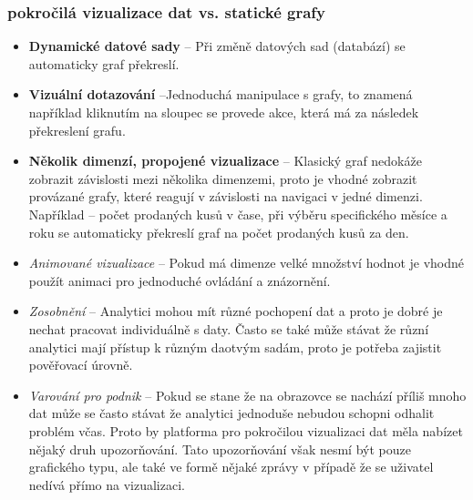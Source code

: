 \subsubsection{pokročilá vizualizace dat vs. statické grafy}
\begin{itemize}
  \item \textbf{Dynamické datové sady} -- Při změně datových sad (databází) se automaticky graf překreslí.
  \item \textbf{Vizuální dotazování} --Jednoduchá manipulace s grafy, to znamená například kliknutím na sloupec se provede akce, která má za následek překreslení grafu. 
  \item \textbf{Několik dimenzí, propojené vizualizace} -- Klasický graf nedokáže zobrazit závislosti mezi několika dimenzemi, proto je vhodné zobrazit provázané grafy, které reagují v závislosti na navigaci v jedné dimenzi. Například -- počet prodaných kusů v čase, při výběru specifického měsíce a roku se automaticky překreslí graf na počet prodaných kusů za den.
  \item \textit{Animované vizualizace} -- Pokud má dimenze velké množství hodnot je vhodné použít animaci pro jednoduché ovládání a znázornění.
  \item \textit{Zosobnění} -- Analytici mohou mít různé pochopení dat a proto je dobré je nechat pracovat individuálně s daty. Často se také může stávat že různí analytici mají přístup k různým daotvým sadám, proto je potřeba zajistit pověřovací úrovně.
  \item \textit{Varování pro podnik} -- Pokud se stane že na obrazovce se nachází příliš mnoho dat může se často stávat že analytici jednoduše nebudou schopni odhalit problém včas. Proto by platforma pro pokročilou vizualizaci dat měla nabízet nějaký druh upozorňování. Tato upozorňování však nesmí být pouze grafického typu, ale také ve formě nějaké zprávy v případě že se uživatel nedívá přímo na vizualizaci. \cite{advanced-data-vizualization-platforms}
\end{itemize}

